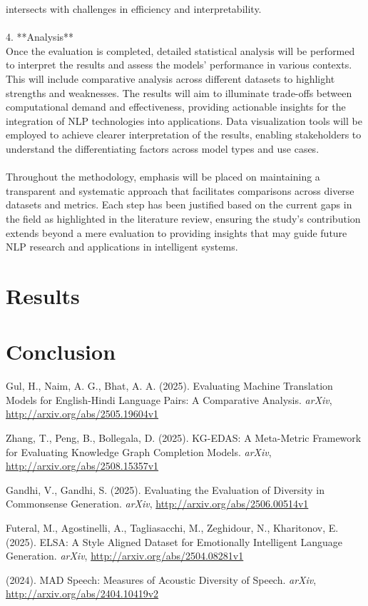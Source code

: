 \documentclass[conference]{IEEEtran}
\begin{document}
intersects with challenges in efficiency and interpretability.\\\\4. **Analysis**\\   Once the evaluation is completed, detailed statistical analysis will be performed to interpret the results and assess the models' performance in various contexts. This will include comparative analysis across different datasets to highlight strengths and weaknesses. The results will aim to illuminate trade-offs between computational demand and effectiveness, providing actionable insights for the integration of NLP technologies into applications. Data visualization tools will be employed to achieve clearer interpretation of the results, enabling stakeholders to understand the differentiating factors across model types and use cases.\\\\Throughout the methodology, emphasis will be placed on maintaining a transparent and systematic approach that facilitates comparisons across diverse datasets and metrics. Each step has been justified based on the current gaps in the field as highlighted in the literature review, ensuring the study's contribution extends beyond a mere evaluation to providing insights that may guide future NLP research and applications in intelligent systems.

\section{Results}


\section{Conclusion}


\begin{thebibliography}{99}

Gul, H., Naim, A. G., Bhat, A. A. (2025). Evaluating Machine Translation Models for English-Hindi Language Pairs: A Comparative Analysis. \textit{arXiv}, \url{http://arxiv.org/abs/2505.19604v1}

Zhang, T., Peng, B., Bollegala, D. (2025). KG-EDAS: A Meta-Metric Framework for Evaluating Knowledge Graph Completion Models. \textit{arXiv}, \url{http://arxiv.org/abs/2508.15357v1}

Gandhi, V., Gandhi, S. (2025). Evaluating the Evaluation of Diversity in Commonsense Generation. \textit{arXiv}, \url{http://arxiv.org/abs/2506.00514v1}

Futeral, M., Agostinelli, A., Tagliasacchi, M., Zeghidour, N., Kharitonov, E. (2025). ELSA: A Style Aligned Dataset for Emotionally Intelligent Language Generation. \textit{arXiv}, \url{http://arxiv.org/abs/2504.08281v1}

(2024). MAD Speech: Measures of Acoustic Diversity of Speech. \textit{arXiv}, \url{http://arxiv.org/abs/2404.10419v2}

\end{thebibliography}
\end{document}
